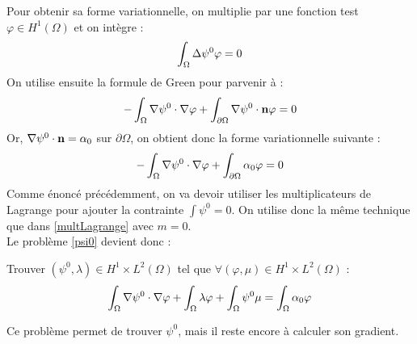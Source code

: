 Pour obtenir sa forme variationnelle, on multiplie par une fonction test $\varphi\in H^1(\Omega)$ et on intègre :
\[ \int_\Omega {\Delta}\psi^0 \varphi = 0 \]
On utilise ensuite la formule de Green pour parvenir à :
\[ -\int_\Omega {\nabla}\psi^0\cdot{\nabla}\varphi + \int_{\partial\Omega} {\nabla}\psi^0\cdot \mathbf{n}\varphi = 0 \]
Or, ${\nabla}\psi^0\cdot \mathbf{n} = \alpha_0$ sur $\partial\Omega$, on obtient donc la forme variationnelle suivante :
\begin{equation*}\label{fvpsi0LM} -\int_\Omega {\nabla}\psi^0\cdot{\nabla}\varphi + \int_{\partial\Omega} \alpha_0\varphi = 0
\end{equation*}
Comme énoncé précédemment, on va devoir utiliser les multiplicateurs de Lagrange pour ajouter la contrainte $\int \psi^0=0$. On utilise donc la même technique que dans \ref{multLagrange} avec $m=0$.\\
Le problème \ref{psi0} devient donc :
\begin{pb}\label{fvpsi0}
Trouver $(\psi^0,\lambda)\in H^1\times L^2(\Omega)$ tel que $\forall (\varphi,\mu)\in H^1\times L^2(\Omega)$ :
\begin{equation*}
\int_\Omega {\nabla}\psi^0\cdot{\nabla}\varphi + \int_\Omega \lambda\varphi + \int_\Omega \psi^0\mu = \int_\Omega \alpha_0\varphi
\end{equation*}\end{pb}
\begin{rk}
Ce problème permet de trouver $\psi^0$, mais il reste encore à calculer son gradient.
\end{rk}

